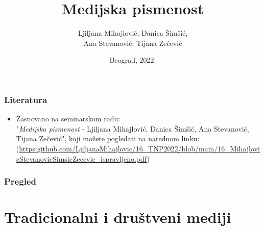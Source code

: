 \documentclass[13pt]{beamer}
\title{Medijska pismenost}
\author{Ljiljana Mihajlović, Danica Šimšić,\\ Ana Stevanović, Tijana Zečević}
\institute{Matematički fakultet \\Univerzitet u Beogradu}
\date{
	\footnotesize{Beograd, 2022.}	
}
\begin{document}
\begin{frame}
	\thispagestyle{empty}
	\titlepage
\end{frame}

\addtocounter{framenumber}{-1}

\begin{frame}
\frametitle{Literatura}
	\begin{itemize}
		\item Zasnovano na seminarskom radu:\\
		 "\emph{Medijska pismenost} - Ljiljana Mihajlović, Danica Šimšić, Ana Stevanović, Tijana Zečević", koji možete pogledati na narednom linku:\\
(\url{https:github.com/LjiljanaMihajlovic/16_TNP2022/blob/main/16_MihajlovicStevanovicSimsicZecevic_ispravljeno.pdf})
  
	\end{itemize}
\end{frame}

\begin{frame}
	\frametitle{Pregled} %
	\tableofcontents[hidesubsections] 
\end{frame}

\section{Tradicionalni i društveni mediji}
\end{document}

